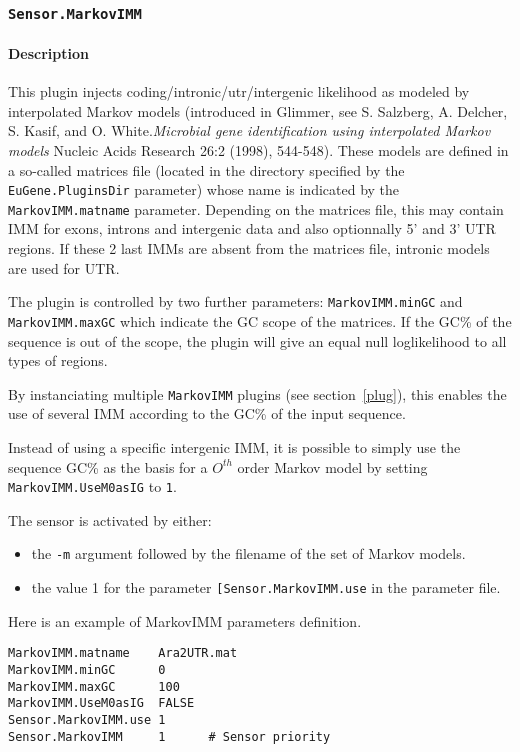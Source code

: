 
\subsubsection{\texttt{Sensor.MarkovIMM}}

\paragraph{Description}

This plugin injects coding/intronic/utr/intergenic likelihood as
modeled by interpolated Markov models (introduced in Glimmer, see S. Salzberg, A. Delcher, S. Kasif, and O. White.{\em Microbial gene identification using interpolated Markov models} Nucleic Acids Research 26:2 (1998), 544-548). These
models are defined in a so-called matrices file (located in the
directory specified by the \texttt{EuGene.PluginsDir} parameter) whose
name is indicated by the \texttt{MarkovIMM.matname}
parameter. Depending on the matrices file, this may contain IMM for
exons, introns and intergenic data and also optionnally 5' and 3' UTR
regions. If these 2 last IMMs are absent from the matrices file,
intronic models are used for UTR.

The plugin is controlled by two further parameters:
\texttt{MarkovIMM.minGC} and \texttt{MarkovIMM.maxGC} which indicate
the GC scope of the matrices. If the GC\% of the sequence is out of
the scope, the plugin will give an equal null loglikelihood to all types
of regions.

By instanciating multiple \texttt{MarkovIMM} plugins (see
section~\ref{plug}), this enables the use of several IMM according to
the GC\% of the input sequence. 

Instead of using a specific intergenic IMM, it is possible to simply
use the sequence GC\% as the basis for a $O^{th}$ order Markov model
by setting \texttt{MarkovIMM.UseM0asIG} to \texttt{1}.

The sensor is activated by either:
\begin{itemize}
\item the \texttt{-m} argument followed by the filename of the set of Markov models.
\item the value 1 for the parameter \texttt{[Sensor.MarkovIMM.use} in
  the parameter file.
\end{itemize}

Here is an example of MarkovIMM parameters definition.
\begin{Verbatim}[fontsize=\small]
MarkovIMM.matname    Ara2UTR.mat
MarkovIMM.minGC      0
MarkovIMM.maxGC      100
MarkovIMM.UseM0asIG  FALSE
Sensor.MarkovIMM.use 1
Sensor.MarkovIMM     1      # Sensor priority
\end{Verbatim}


